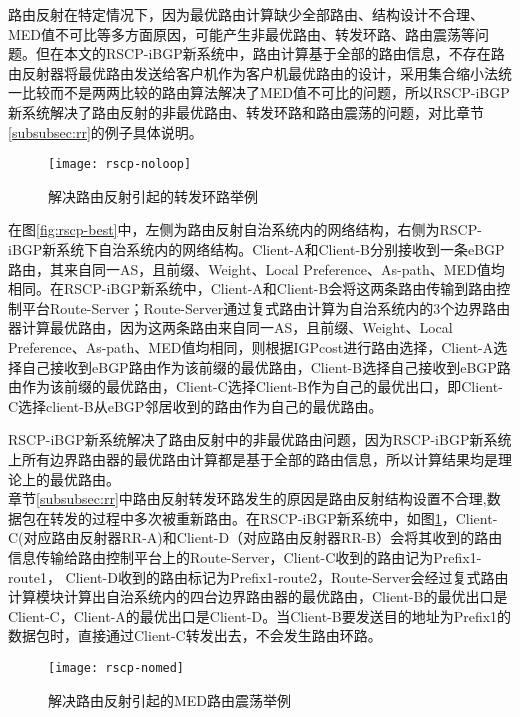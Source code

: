 路由反射在特定情况下，因为最优路由计算缺少全部路由、结构设计不合理、MED值不可比等多方面原因，可能产生非最优路由、转发环路、路由震荡等问题。但在本文的RSCP-iBGP新系统中，路由计算基于全部的路由信息，不存在路由反射器将最优路由发送给客户机作为客户机最优路由的设计，采用集合缩小法统一比较而不是两两比较的路由算法解决了MED值不可比的问题，所以RSCP-iBGP新系统解决了路由反射的非最优路由、转发环路和路由震荡的问题，对比章节\ref{subsubsec:rr}的例子具体说明。\\

\begin{figure}
  \centering
  \texttt{[image: rscp-noloop]}
  \caption{解决路由反射引起的转发环路举例}
  \label{fig:rscp-noloop}
\end{figure}

在图\ref{fig:rscp-best}中，左侧为路由反射自治系统内的网络结构，右侧为RSCP-iBGP新系统下自治系统内的网络结构。Client-A和Client-B分别接收到一条eBGP路由，其来自同一AS，且前缀、Weight、Local Preference、As-path、MED值均相同。在RSCP-iBGP新系统中，Client-A和Client-B会将这两条路由传输到路由控制平台Route-Server；Route-Server通过复式路由计算为自治系统内的3个边界路由器计算最优路由，因为这两条路由来自同一AS，且前缀、Weight、Local Preference、As-path、MED值均相同，则根据IGPcost进行路由选择，Client-A选择自己接收到eBGP路由作为该前缀的最优路由，Client-B选择自己接收到eBGP路由作为该前缀的最优路由，Client-C选择Client-B作为自己的最优出口，即Client-C选择client-B从eBGP邻居收到的路由作为自己的最优路由。

RSCP-iBGP新系统解决了路由反射中的非最优路由问题，因为RSCP-iBGP新系统上所有边界路由器的最优路由计算都是基于全部的路由信息，所以计算结果均是理论上的最优路由。\\




章节\ref{subsubsec:rr}中路由反射转发环路发生的原因是路由反射结构设置不合理,数据包在转发的过程中多次被重新路由。在RSCP-iBGP新系统中，如图\ref{fig:rscp-noloop}，Client-C(对应路由反射器RR-A)和Client-D（对应路由反射器RR-B）会将其收到的路由信息传输给路由控制平台上的Route-Server，Client-C收到的路由记为Prefix1-route1， Client-D收到的路由标记为Prefix1-route2，Route-Server会经过复式路由计算模块计算出自治系统内的四台边界路由器的最优路由，Client-B的最优出口是Client-C，Client-A的最优出口是Client-D。当Client-B要发送目的地址为Prefix1的数据包时，直接通过Client-C转发出去，不会发生路由环路。\\

\begin{figure}
  \centering
  \texttt{[image: rscp-nomed]}
  \caption{解决路由反射引起的MED路由震荡举例}
  \label{fig:rscp-nomed}
\end{figure}



